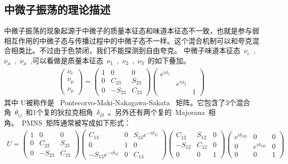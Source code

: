\subsection{中微子振荡的理论描述}
中微子振荡的现象起源于中微子的质量本征态和味道本征态不一致，也就是参与弱相互作用的中微子态与传播过程中的中微子态不一样。这个混合机制可以和夸克混合相类比。不过由于色禁闭，我们不能探测到自由夸克。
中微子味道本征态~$\nu_e$~,~$\nu_{\mu}$~,~$\nu_{\mu}$~,可以看做是质量本征态~$\nu_1$~,~$\nu_2$~,~$\nu_3$~的如下叠加。
\begin{eqnarray}
\left(\begin{array}{c}
\nu_e \\ \nu_{\mu} \\  \nu_{\mu}
 \end{array} \right)
 =\left(\begin{array}{ccc}
      1 & 0 & 0 \\ 0 & C_{23} & S_{23} \\ 0 & -S_{23} & C_{23}
      \end{array} \right)
 \left(\begin{array}{ccc}
    e^{i\phi_1}  &  &    \\
    &  e^{i\phi_2}  &    \\
    &               & 1    \end{array} \right)
\label{eq:linearMix1}
\end{eqnarray}
其中 U被称作是~ Pontecorvo-Maki-Nakagawa-Sakata~ 矩阵。它包含了3个混合角~$\theta_{ij}$~和1个复的狄拉克相角~$\delta_D$~。另外还有两个复的~Majorana~相角。~PMNS~矩阵通常被写成如下形式：
\begin{eqnarray} U
 =\left(\begin{array}{ccc}
      1 & 0 & 0 \\ 0 & C_{23} & S_{23} \\ 0 & -S_{23} & C_{23}
      \end{array} \right)
 \left(\begin{array}{ccc}
      C_{13} & 0 & S_{13}e^{-i\delta_D} \\ 0 & 1 & 0 \\
      -S_{13}e^{-i\delta_D} & 0 & C_{13}
      \end{array} \right)
 \left(\begin{array}{ccc}
      C_{12} & S_{12} & 0 \\ -S_{12} & C_{12} & 0 \\ 0 & 0 & 1
      \end{array} \right)
 \left(\begin{array}{ccc}
    e^{i\delta_{M1}}  & 0 &  0  \\
   0 & e^{i\delta_{M2}}  & 0   \\
    0&     0          & 1    \end{array} \right) 
\label{eq:MMatrix}
\end{eqnarray}
